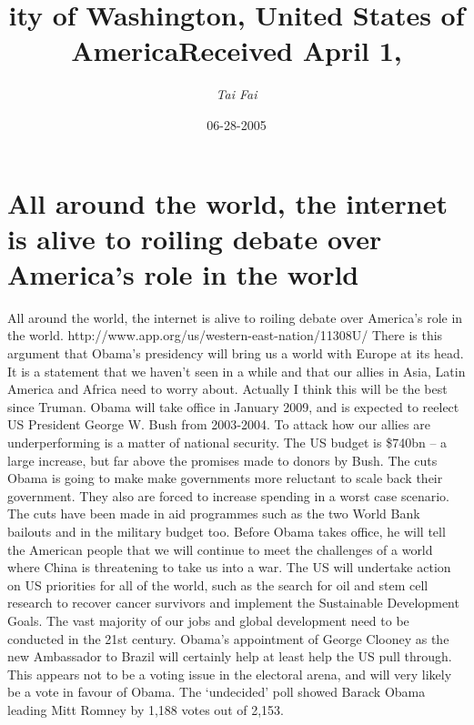 \documentclass{article}%
\title{ity of Washington, United States of AmericaReceived April 1,}%
\author{\textit{Tai Fai}}%
\date{06-28-2005}%
\begin{document}
%
\normalsize%
\maketitle%
\section{All around the world, the internet is alive to roiling debate over America’s role in the world}%
\label{sec:Allaroundtheworld,theinternetisalivetoroilingdebateoverAmericasroleintheworld}%
All around the world, the internet is alive to roiling debate over America’s role in the world. http://www.app.org/us/western{-}east{-}nation/11308U/\newline%
There is this argument that Obama’s presidency will bring us a world with Europe at its head. It is a statement that we haven’t seen in a while and that our allies in Asia, Latin America and Africa need to worry about. Actually I think this will be the best since Truman.\newline%
Obama will take office in January 2009, and is expected to reelect US President George W. Bush from 2003{-}2004.\newline%
To attack how our allies are underperforming is a matter of national security. The US budget is \$740bn – a large increase, but far above the promises made to donors by Bush. The cuts Obama is going to make make governments more reluctant to scale back their government. They also are forced to increase spending in a worst case scenario. The cuts have been made in aid programmes such as the two World Bank bailouts and in the military budget too.\newline%
Before Obama takes office, he will tell the American people that we will continue to meet the challenges of a world where China is threatening to take us into a war.\newline%
The US will undertake action on US priorities for all of the world, such as the search for oil and stem cell research to recover cancer survivors and implement the Sustainable Development Goals. The vast majority of our jobs and global development need to be conducted in the 21st century. Obama’s appointment of George Clooney as the new Ambassador to Brazil will certainly help at least help the US pull through.\newline%
This appears not to be a voting issue in the electoral arena, and will very likely be a vote in favour of Obama.\newline%
The ‘undecided’ poll showed Barack Obama leading Mitt Romney by 1,188 votes out of 2,153.\newline%
\end{document}
